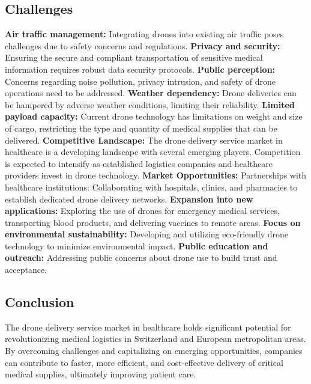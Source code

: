 \subsection{Challenges}
\textbf{Air traffic management:} Integrating drones into existing air traffic poses challenges due to safety concerns and regulations.
\newline
\textbf{Privacy and security:} Ensuring the secure and compliant transportation of sensitive medical information requires robust data security protocols.
\newline
\textbf{Public perception:} Concerns regarding noise pollution, privacy intrusion, and safety of drone operations need to be addressed.
\newline
\textbf{Weather dependency:} Drone deliveries can be hampered by adverse weather conditions, limiting their reliability.
\newline
\textbf{Limited payload capacity:} Current drone technology has limitations on weight and size of cargo, restricting the type and quantity of medical supplies that can be delivered.
\newline
\textbf{Competitive Landscape:} The drone delivery service market in healthcare is a developing landscape with several emerging players. Competition is expected to intensify as established logistics companies and healthcare providers invest in drone technology.
\newline
\textbf{Market Opportunities:} Partnerships with healthcare institutions: Collaborating with hospitals, clinics, and pharmacies to establish dedicated drone delivery networks.
\newline
\textbf{Expansion into new applications:} Exploring the use of drones for emergency medical services, transporting blood products, and delivering vaccines to remote areas.
\newline
\textbf{Focus on environmental sustainability:} Developing and utilizing eco-friendly drone technology to minimize environmental impact.
\newline
\textbf{Public education and outreach:} Addressing public concerns about drone use to build trust and acceptance.
\subsection{Conclusion}
The drone delivery service market in healthcare holds significant potential for revolutionizing medical logistics in Switzerland and European metropolitan areas. By overcoming challenges and capitalizing on emerging opportunities, companies can contribute to faster, more efficient, and cost-effective delivery of critical medical supplies, ultimately improving patient care.

